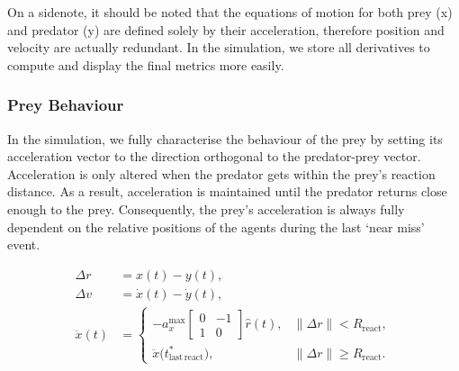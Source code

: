 \documentclass[11pt, twocolumn]{article}
\begin{document}
    On a sidenote, it should be noted that the equations of motion for both prey (x) and predator (y) are defined solely by their acceleration, therefore position and velocity are actually redundant. In the simulation, we store all derivatives to compute and display the final metrics more easily.

    \subsubsection{Prey Behaviour}
    In the simulation, we fully characterise the behaviour of the prey by setting its acceleration vector to the direction orthogonal to the predator-prey vector. Acceleration is only altered when the predator gets within the prey's reaction distance. As a result, acceleration is maintained until the predator returns close enough to the prey. Consequently, the prey's acceleration is always fully dependent on the relative positions of the agents during the last `near miss' event.

    \[
      \begin{aligned}
        \Delta r &= x(t) - y(t), \\
        \Delta v &= \dot{x}(t) - \dot{y}(t), \\
        \ddot{x}(t) &=
        \begin{cases}
          - a_x^{\max}
          \begin{bmatrix}
            0 & -1 \\
            1 & 0
          \end{bmatrix}
          \hat{r}(t), & \|\Delta r\| < R_{\mathrm{react}}, \\[1.2em]
          \ddot{x}\bigl(t^*_{\mathrm{last\,react}}\bigr), & \|\Delta r\| \ge R_{\mathrm{react}}.
        \end{cases}
      \end{aligned}
    \]
\end{document}

